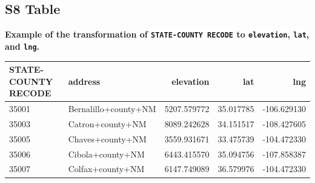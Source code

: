 \documentclass[10pt,letterpaper]{article}
\newcommand{\codewhite}[1]{\colorbox{white}{\texttt{#1}}}
\begin{document}
\subsection*{S8 Table}
\label{S8_Table}
{\bf Example of the transformation of \codewhite{STATE-COUNTY RECODE} to \codewhite{elevation}, \codewhite{lat}, and \codewhite{lng}.}
\begin{table}[H]
\begin{adjustwidth}{-2.25in}{0in} %
\begin{tabular}{llrrr}
\toprule
 STATE-COUNTY RECODE &               address &    elevation &        lat &         lng \\
\midrule
35001 &  Bernalillo+county+NM &  5207.579772 &  35.017785 & -106.629130 \\
35003 &      Catron+county+NM &  8089.242628 &  34.151517 & -108.427605 \\
35005 &      Chaves+county+NM &  3559.931671 &  33.475739 & -104.472330 \\
35006 &      Cibola+county+NM &  6443.415570 &  35.094756 & -107.858387 \\
35007 &      Colfax+county+NM &  6147.749089 &  36.579976 & -104.472330 \\
\bottomrule
\end{tabular}
\end{adjustwidth}
\end{table}
\end{document}

